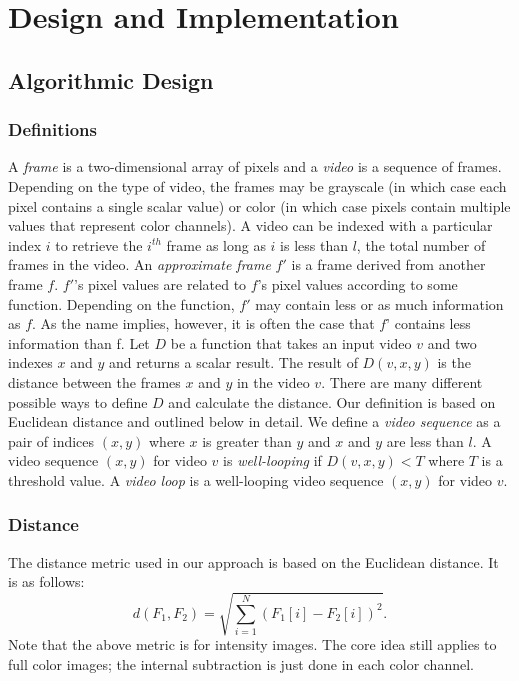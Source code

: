 \section{Design and Implementation}
\label{sec:DesignImplementation}
\subsection{Algorithmic Design}
\label{sec:AlgorithmicDesign}
\subsubsection{Definitions}
\label{sec:Definitions}
A \textit{frame} is a two-dimensional array of pixels and a \textit{video} is a sequence of frames. Depending on the type of video, the frames may be grayscale (in which case each pixel contains a single scalar value) or color (in which case pixels contain multiple values that represent color channels). A video can be indexed with a particular index $i$ to retrieve the $i^{th}$ frame as long as $i$ is less than $l$, the total number of frames in the video. 
An \textit{approximate frame} $f'$ is a frame derived from another frame $f$. $f'$'s pixel values are related to $f$'s pixel values according to some function. Depending on the function, $f'$ may contain less or as much information as $f$. As the name implies, however, it is often the case that $f’$ contains less information than f. 
Let $D$ be a function that takes an input video $v$ and two indexes $x$ and $y$ and returns a scalar result. The result of $D(v, x,y)$ is the distance between the frames $x$ and $y$ in the video $v$. There are many different possible ways to define $D$ and calculate the distance. Our definition is based on Euclidean distance and outlined below in detail.
We define a \textit{video sequence} as a pair of indices $(x,y)$ where $x$ is greater than $y$ and $x$ and $y$ are less than $l$. A video sequence $(x,y)$ for video $v$ is \textit{well-looping} if $D(v,x,y) < T$ where $T$ is a threshold value. A \textit{video loop} is a well-looping video sequence $(x,y)$ for video $v$.
\subsubsection{Distance}
\label{sec:Distance}
The distance metric used in our approach is based on the Euclidean distance. It is as follows:
$$d(F_1,  F_2) = \sqrt{\sum_{i=1}^N (F_1[i] -  F_2[i])^2}.$$
Note that the above metric is for intensity images. The core idea still applies to full color images; the internal subtraction is just done in each color channel. 

